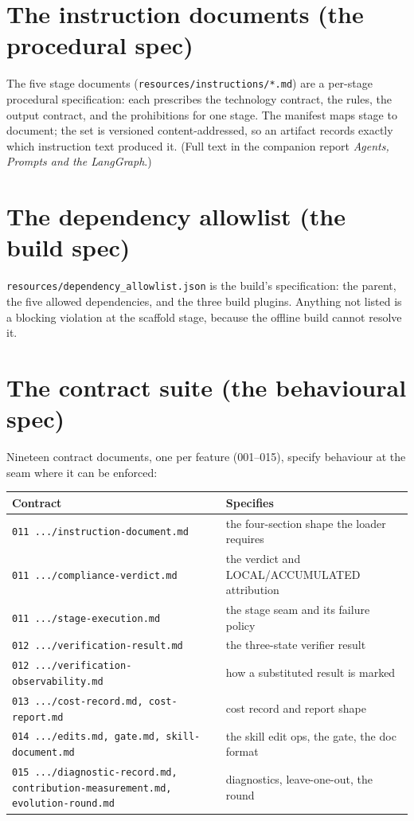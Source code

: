 \documentclass[11pt,a4paper]{article}
\begin{document}
\section{The instruction documents (the procedural spec)}

The five stage documents (\texttt{resources/instructions/*.md}) are a per-stage
procedural specification: each prescribes the technology contract, the rules, the
output contract, and the prohibitions for one stage. The manifest maps stage to
document; the set is versioned content-addressed, so an artifact records exactly
which instruction text produced it. (Full text in the companion report
\emph{Agents, Prompts and the LangGraph}.)

\section{The dependency allowlist (the build spec)}

\texttt{resources/dependency\_allowlist.json} is the build's specification: the parent,
the five allowed dependencies, and the three build plugins. Anything not listed is a
blocking violation at the scaffold stage, because the offline build cannot resolve it.

\section{The contract suite (the behavioural spec)}

Nineteen contract documents, one per feature (001--015), specify behaviour at the
seam where it can be enforced:

\begin{center}
\begin{longtable}{@{}p{}p{}@{}}
\toprule
\textbf{Contract} & \textbf{Specifies} \\
\midrule
\texttt{011 .../instruction-document.md} & the four-section shape the loader requires \\
\texttt{011 .../compliance-verdict.md} & the verdict and LOCAL/ACCUMULATED attribution \\
\texttt{011 .../stage-execution.md} & the stage seam and its failure policy \\
\texttt{012 .../verification-result.md} & the three-state verifier result \\
\texttt{012 .../verification-observability.md} & how a substituted result is marked \\
\texttt{013 .../cost-record.md, cost-report.md} & cost record and report shape \\
\texttt{014 .../edits.md, gate.md, skill-document.md} & the skill edit ops, the gate, the doc format \\
\texttt{015 .../diagnostic-record.md, contribution-measurement.md, evolution-round.md} & diagnostics, leave-one-out, the round \\
\bottomrule
\end{longtable}
\end{center}
\end{document}
